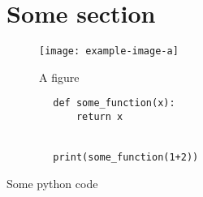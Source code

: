 \section{Some section}

\lipsum[3-10]

\begin{figure}[h]
    \texttt{[image: example-image-a]}
    \caption{A figure}
\end{figure}

\lipsum[11-15]

\begin{listing}
    \begin{verbatim}
        def some_function(x):
            return x
    
    
        print(some_function(1+2))
    \end{verbatim}
    \caption{Some python code}
\end{listing}

\lipsum[16-20]
